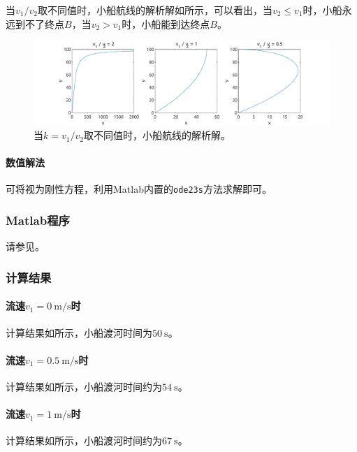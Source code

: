 \documentclass[12pt,a4paper]{article}
\begin{document}
当$v_1/v_2$取不同值时，小船航线的解析解如所示，可以看出，当$v_2 \le v_1$时，小船永远到不了终点$B$，当$v_2 > v_1$时，小船能到达终点$B$。

\begin{figure}
    \centering
    \includegraphics[width=\textwidth]{fig/ex6_analytical.pdf}
    \caption{当$k=v_1/v_2$取不同值时，小船航线的解析解。}
    \label{fig:ex6_analytical}
\end{figure}

\paragraph{数值解法} 可将视为刚性方程，利用Matlab内置的\texttt{ode23s}方法求解即可。

\subsubsection{Matlab程序}

请参见。

\subsubsection{计算结果}

\paragraph{流速$v_1=0\ \mathrm{m/s}$时} 计算结果如所示，小船渡河时间为$50\ \mathrm{s}$。

\paragraph{流速$v_1=0.5\ \mathrm{m/s}$时} 计算结果如所示，小船渡河时间约为$54\ \mathrm{s}$。

\paragraph{流速$v_1=1\ \mathrm{m/s}$时} 计算结果如所示，小船渡河时间约为$67\ \mathrm{s}$。
\end{document}
